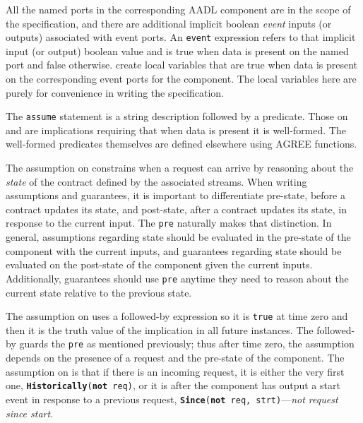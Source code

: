 All the named ports in the corresponding AADL component are in the scope of the specification, and there are additional implicit boolean \emph{event} inputs (or outputs) associated with event ports.
An \texttt{event} expression refers to that implicit input (or output) boolean value and is true when data is present on the named port and false otherwise.
 create local variables that are true when data is present on the corresponding event ports for the component.
The local variables here are purely for convenience in writing the specification.

The \texttt{assume} statement is a string description followed by a predicate.
Those on  and  are implications requiring that when data is present it is well-formed.
The well-formed predicates themselves are defined elsewhere using AGREE functions.

The assumption on  constrains when a request
can arrive by reasoning about the \emph{state} of the contract defined
by the associated streams.  When writing assumptions and guarantees,
it is important to differentiate pre-state, before a contract updates
its state, and post-state, after a contract updates its state, in
response to the current input.  The \texttt{pre} naturally makes that
distinction.  In general, assumptions regarding state should be
evaluated in the pre-state of the component with the current inputs,
and guarantees regarding state should be evaluated on the post-state
of the component given the current inputs.  Additionally, guarantees
should use \texttt{pre} anytime they need to reason about the current
state relative to the previous state.

The assumption on  uses a followed-by expression so it is \texttt{true} at time zero and then it is the truth value of the implication in all future instances.
The followed-by guards the \texttt{pre} as mentioned previously;
thus after time zero, the assumption depends on the presence of a request and the pre-state of the component.
The assumption on  is that if there is an incoming request, it is either the very first one, \texttt{\textbf{Historically}(\textbf{not} req)}, or it is after the component has output a start event in response to a previous request, \texttt{\textbf{Since}(\textbf{not} req, strt)}---\emph{not request since start}.


